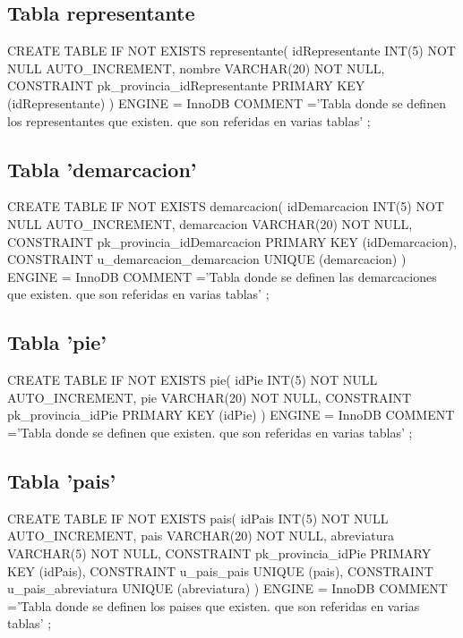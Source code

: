 \documentclass{article}
\begin{document}
  \subsection{Tabla representante}  
    \begin{listing}[style=C]
      CREATE TABLE IF NOT EXISTS representante( 
        idRepresentante INT(5) NOT NULL AUTO_INCREMENT,
        nombre VARCHAR(20) NOT NULL,
        CONSTRAINT pk_provincia_idRepresentante PRIMARY KEY (idRepresentante)
      )
      ENGINE = InnoDB
      COMMENT ='Tabla donde se definen los representantes que existen. que son referidas en varias tablas'
      ;
    \end{listing}

  \subsection{Tabla 'demarcacion'}
    \begin{listing}[style=C]
      CREATE TABLE IF NOT EXISTS demarcacion(
        idDemarcacion INT(5) NOT NULL AUTO_INCREMENT,
        demarcacion VARCHAR(20) NOT NULL,
        CONSTRAINT pk_provincia_idDemarcacion PRIMARY KEY (idDemarcacion),
        CONSTRAINT u_demarcacion_demarcacion UNIQUE (demarcacion)
      )
      ENGINE = InnoDB
      COMMENT ='Tabla donde se definen las demarcaciones que existen. que son referidas en varias tablas'
      ;
    \end{listing}

  \subsection{Tabla 'pie'}
    \begin{listing}[style=C]
      CREATE TABLE IF NOT EXISTS pie(
        idPie INT(5) NOT NULL AUTO_INCREMENT,
        pie VARCHAR(20) NOT NULL,
        CONSTRAINT pk_provincia_idPie PRIMARY KEY (idPie)
      )
      ENGINE = InnoDB
      COMMENT ='Tabla donde se definen  que existen. que son referidas en varias tablas'
      ;
    \end{listing}

  \newpage
  \subsection{Tabla 'pais'}
    \begin{listing}[style=C]
      CREATE TABLE IF NOT EXISTS pais(
        idPais INT(5) NOT NULL AUTO_INCREMENT,
        pais VARCHAR(20) NOT NULL,
        abreviatura VARCHAR(5) NOT NULL,
        CONSTRAINT pk_provincia_idPie PRIMARY KEY (idPais),
        CONSTRAINT u_pais_pais UNIQUE (pais),
        CONSTRAINT u_pais_abreviatura UNIQUE (abreviatura)
      )
      ENGINE = InnoDB
      COMMENT ='Tabla donde se definen los paises que existen. que son referidas en varias tablas'
      ;
    \end{listing}
\end{document}
